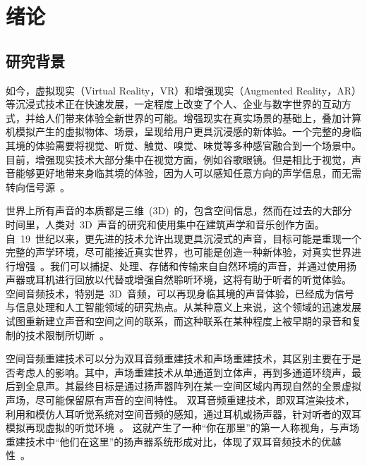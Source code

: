 \chapter{绪论}

\section{研究背景}

如今，虚拟现实（Virtual Reality，VR）和增强现实（Augmented Reality，AR）等沉浸式技术正在快速发展，一定程度上改变了个人、企业与数字世界的互动方式，并给人们带来体验全新世界的可能。增强现实在真实场景的基础上，叠加计算机模拟产生的虚拟物体、场景，呈现给用户更具沉浸感的新体验。一个完整的身临其境的体验需要将视觉、听觉、触觉、嗅觉、味觉等多种感官融合到一个场景中。目前，增强现实技术大部分集中在视觉方面，例如谷歌眼镜。但是相比于视觉，声音能够更好地带来身临其境的体验，因为人可以感知任意方向的声学信息，而无需转向信号源~。

世界上所有声音的本质都是三维~(3D)~的，包含空间信息，然而在过去的大部分时间里，人类对~3D~声音的研究和使用集中在建筑声学和音乐创作方面。自~19~世纪以来，更先进的技术允许出现更具沉浸式的声音，目标可能是重现一个完整的声学环境，尽可能接近真实世界，也可能是创造一种新体验，对真实世界进行增强~。我们可以捕捉、处理、存储和传输来自自然环境的声音，并通过使用扬声器或耳机进行回放以代替或增强自然聆听环境，这将有助于听者的听觉体验。
空间音频技术，特别是~3D~音频，可以再现身临其境的声音体验，已经成为信号与信息处理和人工智能领域的研究热点。从某种意义上来说，这个领域的迅速发展试图重新建立声音和空间之间的联系，而这种联系在某种程度上被早期的录音和复制的技术限制所切断~。


空间音频重建技术可以分为双耳音频重建技术和声场重建技术，其区别主要在于是否考虑人的影响。其中，声场重建技术从单通道到立体声，再到多通道环绕声，最后到全息声。其最终目标是通过扬声器阵列在某一空间区域内再现自然的全景虚拟声场，尽可能保留原有声音的空间特性。
双耳音频重建技术，即双耳渲染技术，利用和模仿人耳听觉系统对空间音频的感知，通过耳机或扬声器，针对听者的双耳模拟再现虚拟的听觉环境~。%
这就产生了一种“你在那里”的第一人称视角，与声场重建技术中“他们在这里”的扬声器系统形成对比，体现了双耳音频技术的优越性~。


